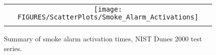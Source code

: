 \begin{figure}[p]
\begin{center}
\begin{tabular}{c}
\texttt{[image: FIGURES/ScatterPlots/Smoke\_Alarm\_Activations]} \\
\vspace{0.25in}
\end{tabular}
\end{center}
\caption[Summary of smoke alarm activation times, NIST Dunes 2000 test series.]
{Summary of smoke alarm activation times, NIST Dunes 2000 test series.}
\label{NIST_Dunes_2000_Scatterplot}
\end{figure}


